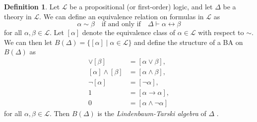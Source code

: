\documentclass{article}
\theoremstyle{definition}
\newtheorem{definition}{Definition}
\theoremstyle{remark}
\begin{document}
\begin{definition} \label{def:algebra_from_logic}
  Let $\mathcal{L}$ be a propositional (or first-order) logic, and let
  $\Delta$ be a theory in $\mathcal{L}$. We can define an equivalence
  relation on formulas in $\mathcal{L}$ as
  \[
    \alpha \sim \beta \quad \text{if and only if} \quad \Delta \vdash \alpha
    \leftrightarrow \beta
  \]
  for all $\alpha, \beta \in \mathcal{L}$. Let $[\alpha]$ denote the equivalence
  class of $\alpha \in \mathcal{L}$ with respect to $\sim$. We can then let
  $B(\Delta) = \{ [\alpha] \mid \alpha \in \mathcal{L} \}$ and define the
  structure of a BA on $B(\Delta)$ as
  \begin{align*}
    [\alpha] \lor [\beta] &= [\alpha \lor \beta], \\
    [\alpha] \land [\beta] &= [\alpha \land \beta], \\
    \neg[\alpha] &= [\neg\alpha], \\
    1 &= [\alpha \to \alpha], \\
    0 &= [\alpha \land \neg\alpha]
  \end{align*}
  for all $\alpha, \beta \in \mathcal{L}$. Then $B(\Delta)$ is the
  \emph{Lindenbaum-Tarski algebra} of $\Delta$
  \cite{koppelberg1989handbook,tarski1983logic}.
\end{definition}
\end{document}
